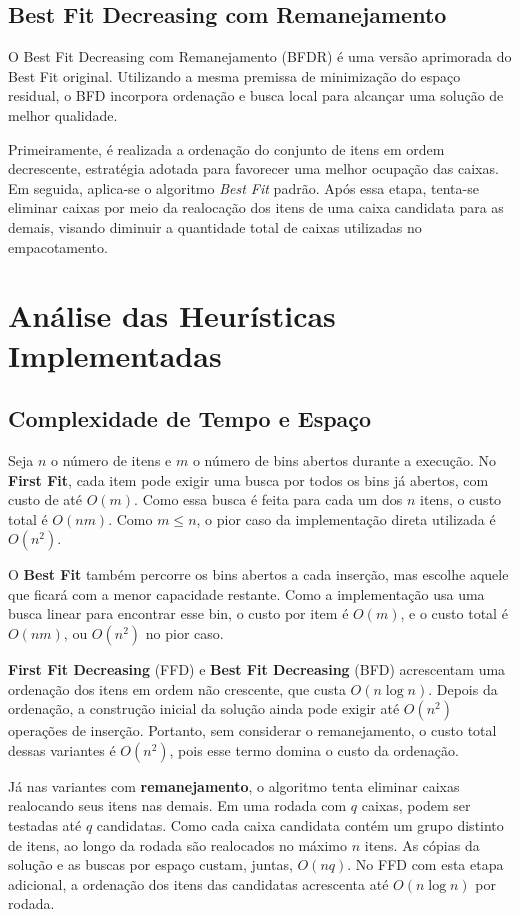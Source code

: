 \documentclass[12pt]{article}
\begin{document}
\subsection{Best Fit Decreasing com Remanejamento}
O  Best Fit Decreasing com Remanejamento (BFDR) é uma versão aprimorada do Best Fit original. Utilizando a mesma premissa de minimização do espaço residual, o BFD incorpora ordenação e busca local para alcançar uma solução de melhor qualidade.

Primeiramente, é realizada a ordenação do conjunto de itens em ordem decrescente, estratégia adotada para favorecer uma melhor ocupação das caixas. Em seguida, aplica-se o algoritmo \textit{Best Fit} padrão. Após essa etapa, tenta-se eliminar caixas por meio da realocação dos itens de uma caixa candidata para as demais, visando diminuir a quantidade total de caixas utilizadas no empacotamento.

\section{Análise das Heurísticas Implementadas}

\subsection{Complexidade de Tempo e Espaço}
Seja $n$ o número de itens e $m$ o número de bins abertos durante a execução. No \textbf{First Fit}, cada item pode exigir uma busca por todos os bins já abertos, com custo de até $O(m)$. Como essa busca é feita para cada um dos $n$ itens, o custo total é $O(nm)$. Como $m \leq n$, o pior caso da implementação direta utilizada é $O(n^2)$.

O \textbf{Best Fit} também percorre os bins abertos a cada inserção, mas escolhe aquele que ficará com a menor capacidade restante. Como a implementação usa uma busca linear para encontrar esse bin, o custo por item é $O(m)$, e o custo total é $O(nm)$, ou $O(n^2)$ no pior caso.

\textbf{First Fit Decreasing} (FFD) e \textbf{Best Fit Decreasing} (BFD) acrescentam uma ordenação dos itens em ordem não crescente, que custa $O(n\log n)$. Depois da ordenação, a construção inicial da solução ainda pode exigir até $O(n^2)$ operações de inserção. Portanto, sem considerar o remanejamento, o custo total dessas variantes é $O(n^2)$, pois esse termo domina o custo da ordenação.

Já nas variantes com \textbf{remanejamento}, o algoritmo tenta eliminar caixas realocando seus itens nas demais. Em uma rodada com $q$ caixas, podem ser testadas até $q$ candidatas. Como cada caixa candidata contém um grupo distinto de itens, ao longo da rodada são realocados no máximo $n$ itens. As cópias da solução e as buscas por espaço custam, juntas, $O(nq)$. No FFD com esta etapa adicional, a ordenação dos itens das candidatas acrescenta até $O(n\log n)$ por rodada.
\end{document}
